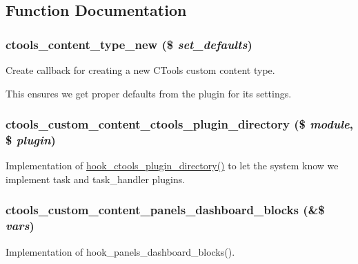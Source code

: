 \subsection{Function Documentation}
\hypertarget{ctools__custom__content_8module_a98509a69bb51e0d72291542e7a64c183}{
\subsubsection[{ctools\_\-content\_\-type\_\-new}]{\setlength{\rightskip}{0pt plus 5cm}ctools\_\-content\_\-type\_\-new (\$ {\em set\_\-defaults})}}
\label{ctools__custom__content_8module_a98509a69bb51e0d72291542e7a64c183}
Create callback for creating a new CTools custom content type.

This ensures we get proper defaults from the plugin for its settings. \hypertarget{ctools__custom__content_8module_a351c998fc523ae1b2d30a31d50f4e83f}{
\subsubsection[{ctools\_\-custom\_\-content\_\-ctools\_\-plugin\_\-directory}]{\setlength{\rightskip}{0pt plus 5cm}ctools\_\-custom\_\-content\_\-ctools\_\-plugin\_\-directory (\$ {\em module}, \/  \$ {\em plugin})}}
\label{ctools__custom__content_8module_a351c998fc523ae1b2d30a31d50f4e83f}
Implementation of \hyperlink{group__hooks_gaf17a0de7a7ca6e6c30c766ea1e44715e}{hook\_\-ctools\_\-plugin\_\-directory()} to let the system know we implement task and task\_\-handler plugins. \hypertarget{ctools__custom__content_8module_aa622884725456ba310ceb77ae8640faa}{
\subsubsection[{ctools\_\-custom\_\-content\_\-panels\_\-dashboard\_\-blocks}]{\setlength{\rightskip}{0pt plus 5cm}ctools\_\-custom\_\-content\_\-panels\_\-dashboard\_\-blocks (\&\$ {\em vars})}}
\label{ctools__custom__content_8module_aa622884725456ba310ceb77ae8640faa}
Implementation of hook\_\-panels\_\-dashboard\_\-blocks().

